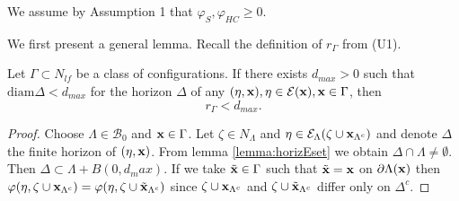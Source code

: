 We assume by Assumption 1 that $\varphi_S,\varphi_{HC}\geq 0$.

We first present a general lemma. Recall the definition of $r_\Gamma$ from (U1). 
\begin{lemma}\label{lemma:U1}
	Let $\Gamma \subset N_{lf}$ be a class of configurations. If there exists $d_{max}>0$ such that $\mathrm{diam}\Delta < d_{max}$ for the horizon $\Delta$ of any $(\eta,{\mathbf{x}}), \eta \in \mathcal E({\mathbf{x}}), {\mathbf{x}} \in \Gamma$, then 
	$$r_\Gamma < d_{max}.$$
\end{lemma}
\begin{proof}
	Choose $\Lambda\in \mathcal B_0$ and ${\mathbf{x}} \in \Gamma$. Let $\zeta \in N_\Lambda$ and $\eta \in \mathcal E_\Lambda(\zeta \cup {\mathbf{x}}_{\Lambda^c})$ and denote $\Delta$ the finite horizon of $(\eta,{\mathbf{x}})$. From lemma \ref{lemma:horizEset} we obtain $\Delta\cap\Lambda \neq \emptyset$. Then $\Delta \subset \Lambda + B(0,d_max)$. If we take $\tilde{{\mathbf{x}}} \in \Gamma$ such that $\tilde{{\mathbf{x}}} = {\mathbf{x}}$ on $\partial\Lambda({\mathbf{x}})$ then $\varphi(\eta,\zeta \cup {\mathbf{x}}_{\Lambda^c}) = \varphi(\eta,\zeta\cup \tilde {{\mathbf{x}}}_{\Lambda^c})$ since $\zeta\cup{\mathbf{x}}_{\Lambda^c}$ and $\zeta\cup\tilde{{\mathbf{x}}}_{\Lambda^c}$ differ only on $\Delta^c$.
\end{proof}


